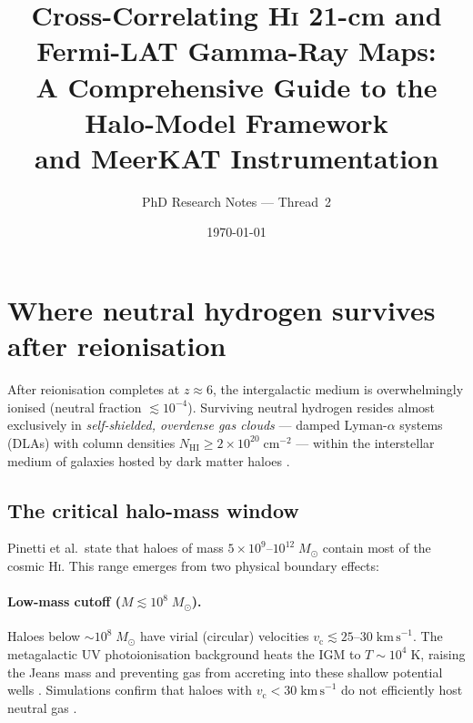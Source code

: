 \documentclass[10pt,a4paper]{article}
\title{Cross-Correlating \texorpdfstring{H\textsc{i}}{HI} 21-cm and Fermi-LAT 
Gamma-Ray Maps:\\
A Comprehensive Guide to the Halo-Model Framework \\
and MeerKAT Instrumentation}
\author{PhD Research Notes --- Thread~2}
\date{\today}
\newcommand{\Msun}{M_{\odot}}
\newcommand{\vc}{v_{\mathrm{c}}}
\begin{document}




\section{Where neutral hydrogen survives after reionisation}
\label{sec:post-reion-HI}

After reionisation completes at $z \approx 6$, the intergalactic medium is
overwhelmingly ionised (neutral fraction $\lesssim 10^{-4}$).  Surviving neutral
hydrogen resides almost exclusively in \emph{self-shielded, overdense gas clouds}
--- damped Lyman-$\alpha$ systems (DLAs) with column densities
$N_{\mathrm{HI}} \ge 2 \times 10^{20}\;\mathrm{cm}^{-2}$ --- within the
interstellar medium of galaxies hosted by dark matter haloes
\citep{Wolfe2005}.


\subsection{The critical halo-mass window}

Pinetti et al.\ state that haloes of mass
$5 \times 10^{9}$--$10^{12}\;\Msun$ contain most of the cosmic H\textsc{i}.
This range emerges from two physical boundary effects:

\paragraph{Low-mass cutoff ($M \lesssim 10^{8}\;\Msun$).}
Haloes below $\sim\!10^{8}\;\Msun$ have virial (circular) velocities
$\vc \lesssim 25$--$30\;\mathrm{km\,s}^{-1}$.  The metagalactic UV
photoionisation background heats the IGM to $T \sim 10^{4}\;\mathrm{K}$,
raising the Jeans mass and preventing gas from accreting into these shallow
potential wells \citep{Rees1986,Efstathiou1992,Pontzen2008}.  Simulations
confirm that haloes with $\vc < 30\;\mathrm{km\,s}^{-1}$ do not efficiently
host neutral gas \citep{Bagla2010}.
\end{document}
